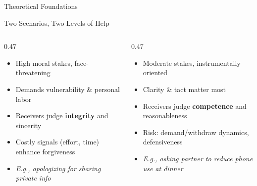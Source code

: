 \documentclass[10pt,aspectratio=169]{beamer}
\newcommand{\emphmark}[1]{\textcolor{chiAccent}{\textbf{#1}}}
\begin{document}
\begin{frame}{Theoretical Foundations}
\begin{center}
\end{center}
\end{frame}

\begin{frame}{Two Scenarios, Two Levels of Help}
\begin{columns}[T]
\scriptsize
\begin{column}{0.47\textwidth}
  \begin{keybox}
    \begin{itemize}\setlength\itemsep{2pt}
      \item High moral stakes, face-threatening
      \item Demands vulnerability \& personal labor
      \item Receivers judge \emphmark{integrity} and sincerity
      \item Costly signals (effort, time) enhance forgiveness
      \item \textit{E.g., apologizing for sharing private info}
    \end{itemize}
  \end{keybox}
\end{column}
\begin{column}{0.47\textwidth}
  \begin{keybox}
    \begin{itemize}\setlength\itemsep{2pt}
      \item Moderate stakes, instrumentally oriented
      \item Clarity \& tact matter most
      \item Receivers judge \emphmark{competence} and reasonableness
      \item Risk: demand/withdraw dynamics, defensiveness
      \item \textit{E.g., asking partner to reduce phone use at dinner}
    \end{itemize}
  \end{keybox}

\end{column}
\end{columns}
\end{frame}
\end{document}
